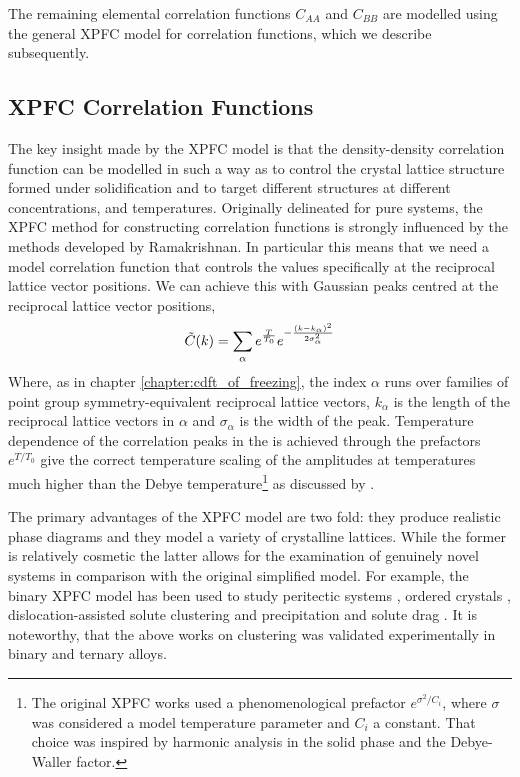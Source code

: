 The remaining elemental correlation functions $C_{AA}$ and $C_{BB}$ are modelled
using the general XPFC model for correlation functions, which we describe
subsequently.

\subsection{XPFC Correlation Functions} %

The key insight made by the XPFC model is that the density-density
correlation function can be modelled in such a way as to control the crystal
lattice structure formed under solidification and to target different structures at
different concentrations, and temperatures. Originally delineated for pure
systems, the XPFC method for constructing correlation functions is strongly
influenced by the methods developed by Ramakrishnan. In particular this means
that we need a model correlation function that controls the values specifically
at the reciprocal lattice vector positions. We can achieve this with Gaussian
peaks centred at the reciprocal lattice vector positions,
%
\begin{equation}
    \tilde{C}(k) = \sum_{\alpha} e^{\frac{T}{T_0}}
        e^{ - \frac{(k - k_\alpha)^2}{2\sigma_\alpha^2}}
        \label{XPFC_C2}
\end{equation}
%
Where, as in chapter \ref{chapter:cdft_of_freezing}, the index $\alpha$ runs
over families of point group symmetry-equivalent reciprocal lattice vectors,
$k_\alpha$ is the length of the reciprocal lattice vectors in $\alpha$ and
$\sigma_\alpha$ is the width of the peak. Temperature dependence of the
correlation peaks in the is achieved through the prefactors $e^{T / T_0}$ give
the correct temperature scaling of the amplitudes at temperatures much higher
than the Debye temperature\footnote{The original XPFC works used a
phenomenological prefactor $e^{\sigma^2 / C_i}$, where $\sigma$ was considered
a model temperature parameter and $C_i$ a constant. That choice was inspired by
harmonic analysis in the solid phase and the Debye-Waller factor.} as discussed
by \cite{ALSTER17}.

The primary advantages of the XPFC model are two fold: they produce realistic
phase diagrams and they model a variety of crystalline lattices. While the
former is relatively cosmetic the latter allows for the examination of
genuinely novel systems in comparison with the original simplified model. For
example, the binary XPFC model has been used to study peritectic systems
\cite{GREENWOOD11_BINARY}, ordered crystals \cite{ALSTER17},
dislocation-assisted solute clustering and precipitation \cite{FALLAH12,
FALLAH13} and solute drag \cite{GREENWOOD12}. It is noteworthy, that the above
works on clustering was validated experimentally in binary and ternary alloys.

